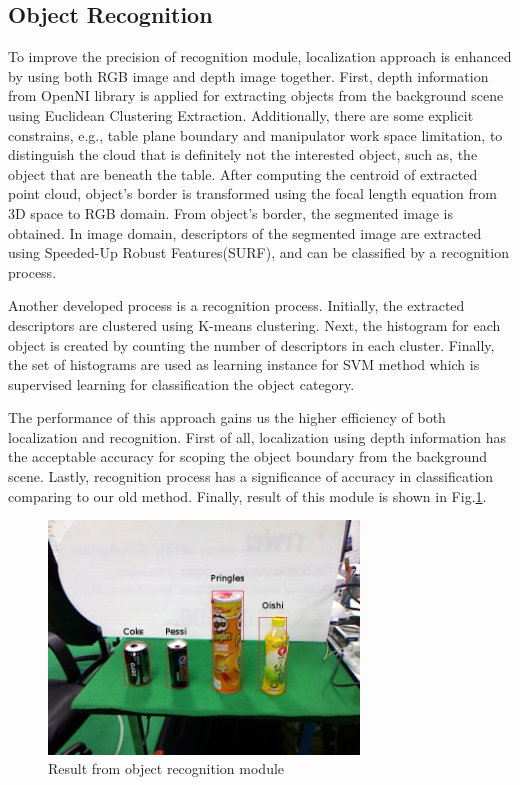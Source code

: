 \documentclass{llncs}
\begin{document}
\subsection{Object Recognition}
    
To improve the precision of recognition module, localization approach is enhanced by using both RGB image and depth image together. First, depth information from OpenNI library is applied for extracting objects from the background scene using Euclidean Clustering Extraction\cite{ece}\cite{rudu.thesis}. Additionally, there are some explicit constrains, e.g., table plane boundary and manipulator work space limitation, to distinguish the cloud that is definitely not the interested object, such as, the object that are beneath the table. After computing the centroid of extracted point cloud, object's border is transformed using the focal length equation from 3D space to RGB domain. From object's border, the segmented image is obtained. In image domain, descriptors of the segmented image are extracted using Speeded-Up Robust Features(SURF), and can be classified by a recognition process.

Another developed process is a recognition process. Initially, the extracted descriptors are clustered using K-means clustering. Next, the histogram for each object is created by counting the number of descriptors in each cluster. Finally, the set of histograms are used as learning instance for SVM method which is supervised learning for classification the object category\cite{obj_rec}.

The performance of this approach gains us the higher efficiency of both localization and recognition. First of all, localization using depth information has the acceptable accuracy for scoping the object boundary from the background scene. Lastly, recognition process has a significance of accuracy in classification comparing to our old method. Finally, result of this module is shown in Fig.\ref{fig:object_recog}.

\begin{figure}
\centering
\includegraphics[height=6.2cm]{object_recognition_figure}
\caption{Result from object recognition module}
\label{fig:object_recog}
\end{figure}
\end{document}
